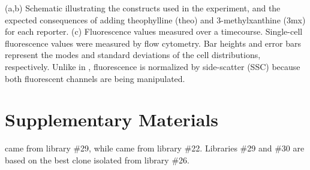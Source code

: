\documentclass[10pt,oneside]{article}
\begin{document}


 (a,b) Schematic illustrating the constructs used in the experiment, and the expected consequences of adding theophylline (theo) and 3-methylxanthine (3mx) for each reporter.
 (c) Fluorescence values measured over a  timecourse.  Single-cell fluorescence values were measured by flow cytometry.  Bar heights and error bars represent the modes and standard deviations of the cell distributions, respectively.  Unlike in , fluorescence is normalized by side-scatter (SSC) because both fluorescent channels are being manipulated.

\section{Supplementary Materials}






      \ligrnaF{} came from library \#29, while \ligrnaB{} came from library \#22.  Libraries \#29 and \#30 are based on the best clone isolated from library \#26.


\end{document}
